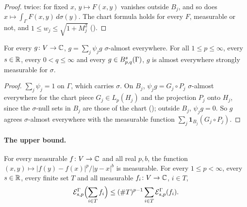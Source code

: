 \begin{proof}
\leanok
{} twice: for fixed $x$, $y \mapsto F(x, y)$ vanishes outside
$B_j$, and so does $x \mapsto \int_\Gamma F(x, y) \, d\sigma(y)$. The chart formula holds for
every $F$, measurable or not, and $1 \leq w_j \leq \sqrt{1 + M_j^2}$
().
\end{proof}

\begin{lemma}
\label{lem:boundary-besov-measurable}
\leanok
{}
For every $g \colon V \to \mathbb{C}$, $g = \sum_j \psi_j g$ $\sigma$-almost everywhere. For all
$1 \leq p \leq \infty$, every $s \in \mathbb{R}$, every $0 < q \leq \infty$ and every
$g \in B^{s}_{p,q}(\Gamma)$, $g$ is almost everywhere strongly measurable for $\sigma$.
\end{lemma}

\begin{proof}
\leanok
$\sum_j \psi_j = 1$ on $\Gamma$, which carries $\sigma$. On $B_j$, $\psi_j g = G_j \circ P_j$
$\sigma$-almost everywhere for the chart piece $G_j \in L_p(H_j)$ and the projection $P_j$ onto
$H_j$, since the $\sigma$-null sets in $B_j$ are those of the chart
(); outside $B_j$, $\psi_j g = 0$. So $g$ agrees
$\sigma$-almost everywhere with the measurable function $\sum_j \mathbf 1_{B_j} (G_j \circ P_j)$.
\end{proof}

\paragraph{The upper bound.}

\begin{lemma}
\label{lem:boundary-slobodeckij-sum}
\leanok
{}
For every measurable $f \colon V \to \mathbb{C}$ and all real $p, b$, the function
$(x, y) \mapsto |f(y) - f(x)|^p / |y - x|^b$ is measurable. For every $1 \leq p < \infty$, every
$s \in \mathbb{R}$, every finite set $T$ and all measurable $f_i \colon V \to \mathbb{C}$, $i \in T$,
\[
  \mathcal{E}^\Gamma_{s,p}\Bigl(\sum_{i \in T} f_i\Bigr) \leq (\# T)^{p-1}
    \sum_{i \in T} \mathcal{E}^\Gamma_{s,p}(f_i) .
\]
\end{lemma}

